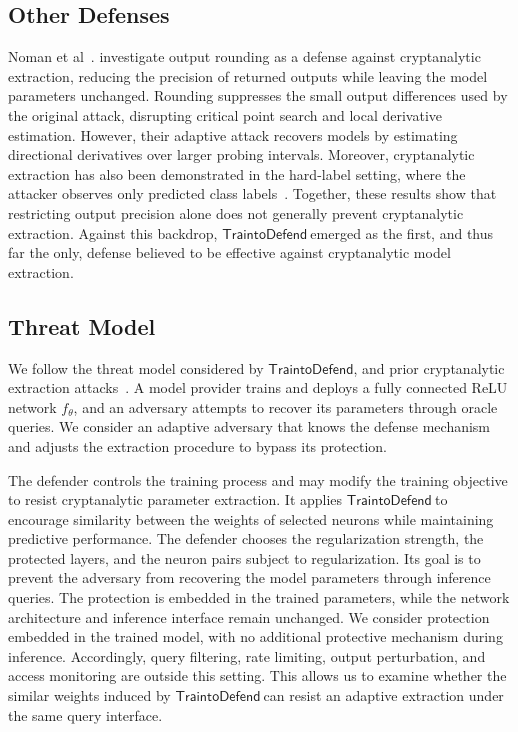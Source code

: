 \documentclass[runningheads]{llncs}
\newcommand{\mypara}[1]{\smallskip\noindent{\bf {#1}.} \xspace}
\newcommand{\td}{$\mathsf{Train to Defend}~$}
\newcommand{\nospacetd}{$\mathsf{Train to Defend}$}
\begin{document}
\subsection{Other Defenses}
Noman et al~\cite{mit65610_2026_rounding}. investigate output rounding as a defense against cryptanalytic extraction, reducing the precision of returned outputs while leaving the model parameters unchanged.
Rounding suppresses the small output differences used by the original attack, disrupting critical point search and local derivative estimation.
However, their adaptive attack recovers models by estimating directional derivatives over larger probing intervals.
Moreover, cryptanalytic extraction has also been demonstrated in the hard-label setting, where the attacker observes only predicted class labels~\cite{chen_asiacrypt_cea3,carlini_eurocrypt_cea4}.
Together, these results show that restricting output precision alone does not generally prevent cryptanalytic extraction.
Against this backdrop, \td emerged as the first, and thus far the only, defense believed to be effective against cryptanalytic model extraction.

\subsection{Threat Model}
\label{sec:goals}
We follow the threat model considered by \nospacetd, and prior cryptanalytic extraction attacks~\cite{kurian_neurips_ced1,carlini_crypto_cea1,foerster_neurips_cea5}.
A model provider trains and deploys a fully connected ReLU network $f_\theta$, and an adversary attempts to recover its parameters through oracle queries.
We consider an adaptive adversary that knows the defense mechanism and adjusts the extraction procedure to bypass its protection.

\mypara{Defender Goals and Resources}
The defender controls the training process and may modify the training objective to resist cryptanalytic parameter extraction.
It applies \td to encourage similarity between the weights of selected neurons while maintaining predictive performance.
The defender chooses the regularization strength, the protected layers, and the neuron pairs subject to regularization.
Its goal is to prevent the adversary from recovering the model parameters through inference queries.
The protection is embedded in the trained parameters, while the network architecture and inference interface remain unchanged.
We consider protection embedded in the trained model, with no additional protective mechanism during inference.
Accordingly, query filtering, rate limiting, output perturbation, and access monitoring are outside this setting.
This allows us to examine whether the similar weights induced by \td can resist an adaptive extraction under the same query interface.
\end{document}
